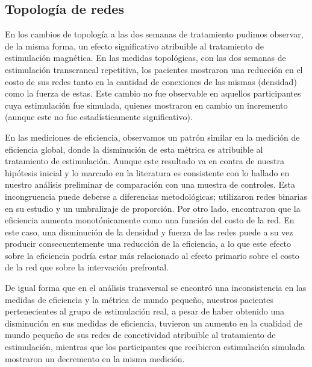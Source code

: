 \subsection{Topología de redes}
En los cambios de topología a las dos semanas de tratamiento pudimos observar, de la misma forma, un efecto significativo atribuible al tratamiento de estimulación magnética. En las medidas topológicas, con las dos semanas de estimulación transcraneal repetitiva, los pacientes mostraron una reducción en el costo de sus redes tanto en la cantidad de conexiones de las mismas (densidad) como la fuerza de estas. Este cambio no fue observable en aquellos participantes cuya estimulación fue simulada, quienes mostraron en cambio un incremento (aunque este no fue estadísticamente significativo).\par
En las mediciones de eficiencia, observamos un patrón similar en la medición de eficiencia global, donde la disminución de esta métrica es atribuible al tratamiento de estimulación. Aunque este resultado va en contra de nuestra hipótesis inicial y lo marcado en la literatura \parencite{Wang2015a} es consistente con lo hallado en nuestro análisis preliminar de comparación con una muestra de controles. Esta incongruencia puede deberse a diferencias metodológicas; \textcite{Wang2015a} utilizaron redes binarias en su estudio y un umbralizaje de proporción. Por otro lado, \textcite{Achard2007}encontraron que la eficiencia aumenta monotónicamente como una función del costo de la red. En este caso, una disminución de la densidad y fuerza de las redes puede a su vez producir consecuentemente una reducción de la eficiencia, a lo que este efecto sobre la eficiencia podría estar más relacionado al efecto primario sobre el costo de la red que sobre la intervación prefrontal. \par
De igual forma que en el análisis transversal se encontró una inconsistencia en las medidas de eficiencia y la métrica de mundo pequeño, nuestros pacientes pertenecientes al grupo de estimulación real, a pesar de haber obtenido una disminución en sus medidas de eficiencia, tuvieron un aumento en la cualidad de mundo pequeño de sus redes de conectividad atribuible al tratamiento de estimulación, mientras que los participantes que recibieron estimulación simulada mostraron un decremento en la misma medición. \par
